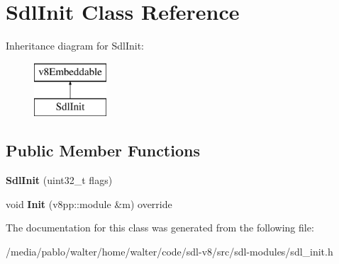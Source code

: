 \hypertarget{classSdlInit}{}\section{Sdl\+Init Class Reference}
\label{classSdlInit}
Inheritance diagram for Sdl\+Init\+:\begin{figure}[H]
\begin{center}
\leavevmode
\includegraphics[height=2.000000cm]{classSdlInit}
\end{center}
\end{figure}
\subsection*{Public Member Functions}
\begin{DoxyCompactItemize}
\item 
\mbox{\label{classSdlInit_a4e905b583daa63fc2bf7b486f23e1063}} 
{\bfseries Sdl\+Init} (uint32\+\_\+t flags)
\item 
\mbox{\label{classSdlInit_aedf57c85393638cf0fbf56ce9b763b03}} 
void {\bfseries Init} (v8pp\+::module \&m) override
\end{DoxyCompactItemize}


The documentation for this class was generated from the following file\+:\begin{DoxyCompactItemize}
\item 
/media/pablo/walter/home/walter/code/sdl-\/v8/src/sdl-\/modules/sdl\+\_\+init.\+h\end{DoxyCompactItemize}
